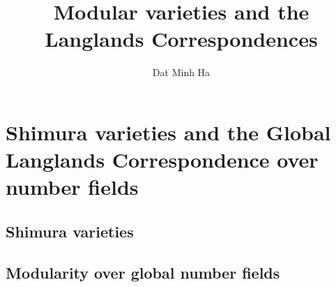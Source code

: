

\setcounter{section}{-1}





	\title{Modular varieties and the Langlands Correspondences}
	
	\author{Dat Minh Ha}
	\maketitle
	
	\begin{abstract}
	    
	\end{abstract}
	
	{
      \hypersetup{} 
      \dominitoc
      \tableofcontents %
    }
    
    \part{Shimura varieties and the Global Langlands Correspondence over number fields}
        \chapter{Shimura varieties}
            \begin{abstract}
                
            \end{abstract}
            
            \minitoc
            
            
            
            
            
            
            
        \chapter{Modularity over global number fields}
            \begin{abstract}
                
            \end{abstract}
            

